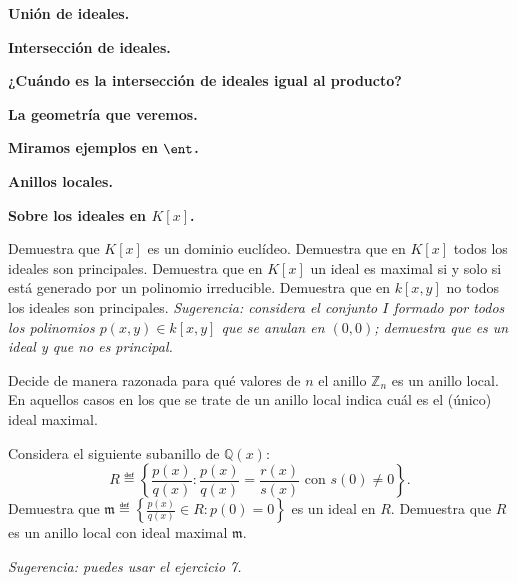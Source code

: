 \begin{problem}
{\bfseries Unión de ideales.}
\solution
\end{problem}

\begin{problem}
{\bfseries Intersección de ideales.}
\solution
\end{problem}

\begin{problem}
{\bfseries ¿Cuándo es la intersección de ideales igual al producto?}
\solution
\end{problem}

\begin{problem}
{\bfseries La geometría que veremos.}
\solution
\end{problem}

\begin{problem}
{\bfseries Miramos ejemplos en $\ent$.}
\solution
\end{problem}

\begin{problem}
{\bfseries Anillos locales.}
\solution
\end{problem}

\begin{problem}
\solution
\end{problem}

\noindent {}

\begin{problem}
{\bfseries Sobre los ideales en $K[x]$.}

\ppart Demuestra que $K[x]$ es un dominio euclídeo.
\ppart Demuestra que en $K[x]$ todos los ideales son principales.
\ppart Demuestra que en $K[x]$ un ideal es maximal si y solo si está generado por un polinomio irreducible.
\ppart Demuestra que en $k[x,y]$ no todos los ideales son principales. {\em Sugerencia: considera el conjunto $I$ formado por todos los polinomios $p(x,y)\in k[x,y]$ que se anulan en $(0,0)$; demuestra que es un ideal y que no es principal.}
\solution
\end{problem}

\begin{problem}
Decide de manera razonada para qué valores de $n$ el anillo ${\mathbb Z}_n$ es un anillo local. En aquellos casos en los que se trate de un anillo local indica cuál es el (único) ideal maximal.
\solution
\end{problem}

\begin{problem}
Considera el siguiente subanillo de ${\mathbb Q}(x)$:
$$R ≝\left\{\frac{p(x)}{q(x)}: \frac{p(x)}{q(x)} =\frac{r(x)}{s(x)} \text{ con }  s(0)\neq 0\right\}. $$
\ppart  Demuestra que  ${\mathfrak m} ≝ \left\{\frac{p(x)}{q(x)}\in R: p(0)=0\right\}$ es un ideal en $R$.
\ppart  Demuestra que $R$ es un anillo local con ideal maximal $\mathfrak m$.

{\em Sugerencia: puedes usar el ejercicio 7.}
\solution
\end{problem}

